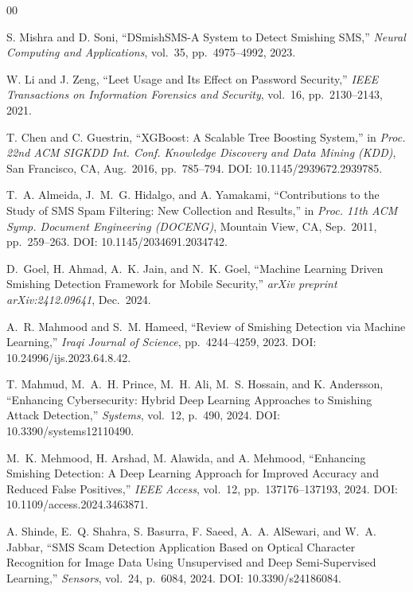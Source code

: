 \documentclass[conference]{IEEEtran}
\begin{document}
\balance
\begin{thebibliography}{00}

S. Mishra and D. Soni,
``DSmishSMS-A System to Detect Smishing SMS,''
\textit{Neural Computing and Applications},
vol.~35, pp.~4975--4992, 2023.

W. Li and J. Zeng,
``Leet Usage and Its Effect on Password Security,''
\textit{IEEE Transactions on Information Forensics and Security},
vol.~16, pp.~2130--2143, 2021.

T. Chen and C. Guestrin,
``XGBoost: A Scalable Tree Boosting System,''
in \textit{Proc. 22nd ACM SIGKDD Int. Conf. Knowledge Discovery and
Data Mining (KDD)}, San Francisco, CA, Aug.\ 2016, pp.\ 785--794.
DOI: 10.1145/2939672.2939785.

T.~A. Almeida, J.~M.~G. Hidalgo, and A. Yamakami,
``Contributions to the Study of SMS Spam Filtering: New Collection and
Results,''
in \textit{Proc. 11th ACM Symp. Document Engineering (DOCENG)},
Mountain View, CA, Sep.\ 2011, pp.\ 259--263.
DOI: 10.1145/2034691.2034742.

D.~Goel, H. Ahmad, A.~K. Jain, and N.~K. Goel,
``Machine Learning Driven Smishing Detection Framework for Mobile Security,''
\textit{arXiv preprint arXiv:2412.09641}, Dec.\ 2024.

A.~R. Mahmood and S.~M. Hameed,
``Review of Smishing Detection via Machine Learning,''
\textit{Iraqi Journal of Science},
pp.~4244--4259, 2023.
DOI: 10.24996/ijs.2023.64.8.42.

T. Mahmud, M.~A.~H. Prince, M.~H. Ali, M.~S. Hossain, and K. Andersson,
``Enhancing Cybersecurity: Hybrid Deep Learning Approaches to Smishing
Attack Detection,''
\textit{Systems}, vol.~12, p.~490, 2024.
DOI: 10.3390/systems12110490.

M.~K. Mehmood, H. Arshad, M. Alawida, and A. Mehmood,
``Enhancing Smishing Detection: A Deep Learning Approach for Improved
Accuracy and Reduced False Positives,''
\textit{IEEE Access}, vol.~12, pp.~137176--137193, 2024.
DOI: 10.1109/access.2024.3463871.

A. Shinde, E.~Q. Shahra, S. Basurra, F. Saeed, A.~A. AlSewari,
and W.~A. Jabbar,
``SMS Scam Detection Application Based on Optical Character Recognition
for Image Data Using Unsupervised and Deep Semi-Supervised Learning,''
\textit{Sensors}, vol.~24, p.~6084, 2024.
DOI: 10.3390/s24186084.


\end{thebibliography}
\end{document}
